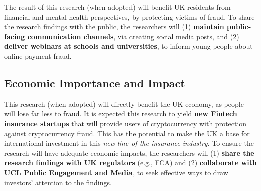 The result of this research (when adopted) will benefit UK residents from financial and mental health perspectives, by protecting victims of fraud. To share the research findings with the public, the researchers will (1) \textbf{maintain public-facing communication channels}, via creating social media posts, and (2) \textbf{deliver webinars at schools and universities}, to inform young people about online payment fraud.   






\vspace{-5mm}
\subsection{Economic Importance and Impact}
\vspace{-1mm}
This research (when adopted) will directly benefit the UK economy, as people will lose far less to fraud. It is expected this research to yield \textbf{new Fintech insurance startups} that will provide users of cryptocurrency with protection against cryptocurrency fraud. This has the potential to make the UK a base for international investment in this \emph{new line of the insurance industry}. To ensure the research will have adequate economic impacts, the researchers will (1) \textbf{share the research findings with UK regulators} (e.g., FCA) and (2) \textbf{collaborate with UCL Public Engagement and Media}, to seek effective ways to draw investors' attention to the findings.



%
%
%

